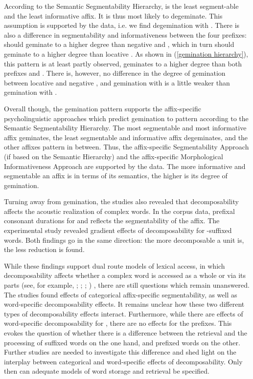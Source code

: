 According to the Semantic Segmentability Hierarchy,  is the least segment-able and the least informative affix. It is thus most likely to degeminate. This assumption is supported by the data, i.e. we find degemination with . There is also a difference in segmentability and informativeness between the four prefixes:  should geminate to a higher degree than negative  and , which in turn should geminate to a higher degree than locative . As shown in (\ref{gemination hierarchy}), this pattern is at least partly observed,  geminates to a higher degree than both prefixes and . There is, however, no difference in the degree of gemination between locative  and negative , and gemination with  is a little weaker than gemination with . 


Overall though, the gemination pattern supports the affix-specific psycholinguistic approaches which predict gemination to pattern according to the Semantic Segmentability Hierarchy. The most segmentable and most informative affix  geminates, the least segmentable and informative affix  degeminates, and the other affixes pattern in between.
Thus, the affix-specific Segmentability Approach (if based on the Semantic Hierarchy) and the affix-specific Morphological Informativeness Approach are supported by the data. The more informative and segmentable an affix is in terms of its semantics, the higher is its degree of gemination.


Turning away from gemination, the studies also revealed that decomposability affects the acoustic realization of complex words.
 In the corpus data, prefixal consonant durations for  and  reflects the segmentability of the affix. 
The experimental study revealed gradient effects of decomposability for -suffixed words. 
Both findings go in the same direction: the more decomposable a unit is, the less reduction is found. 

While these findings support dual route models of lexical access, in which decomposability affects whether a complex word is accessed as a whole or via its parts (see, for example, \citealt{Frauenfelder.1992}; \citealt{Schreuder.2015}; \citealt{deVaan.2011}; \citealt{Caselli.2016})
, there are still questions which remain unanswered. The studies found effects of categorical affix-specific segmentability, as well as word-specific decomposability effects. It remains unclear how these two different types of decomposability effects interact. Furthermore, while there are effects of word-specific decomposability for , there are no effects for the prefixes. This evokes the question of whether there is a difference between the retrieval and the processing of suffixed words on the one hand, and prefixed words on the other. Further studies are needed to investigate this difference and shed light on the interplay between categorical and word-specific effects of decomposability. Only then can adequate models of word storage and retrieval be specified. 



